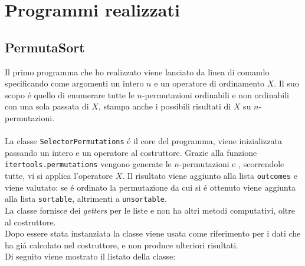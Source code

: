 	\chapter{Programmi realizzati}
\section*{PermutaSort}
Il primo programma che ho realizzato viene lanciato da linea di comando specificando come argomenti un intero $n$ e un operatore di ordinamento $X$. Il suo scopo \'e quello di enumerare tutte le $n$-permutazioni ordinabili e non ordinabili con una sola passata di $X$, stampa anche i possibili risultati di $X$ su $n$-permutazioni.\\\\
La classe \texttt{SelectorPermutations} \'e il core del programma, viene inizializzata passando un intero e un operatore al costruttore. Grazie alla funzione \texttt{itertools.permutations} vengono generate le $n$-permutazioni e , scorrendole tutte, vi si applica l'operatore $X$. Il risultato viene aggiunto alla lista \texttt{outcomes} e viene valutato: se \'e ordinato la permutazione da cui si \'e ottenuto viene aggiunta alla lista \texttt{sortable}, altrimenti a \texttt{unsortable}.\\La classe fornisce dei \textit{getters} per le liste e non ha altri metodi computativi, oltre al costruttore.\\
Dopo essere stata instanziata la classe viene usata come riferimento per i dati che ha gi\'a calcolato nel costruttore, e non produce ulteriori risultati.\\Di seguito viene mostrato il listato della classe:
\\
